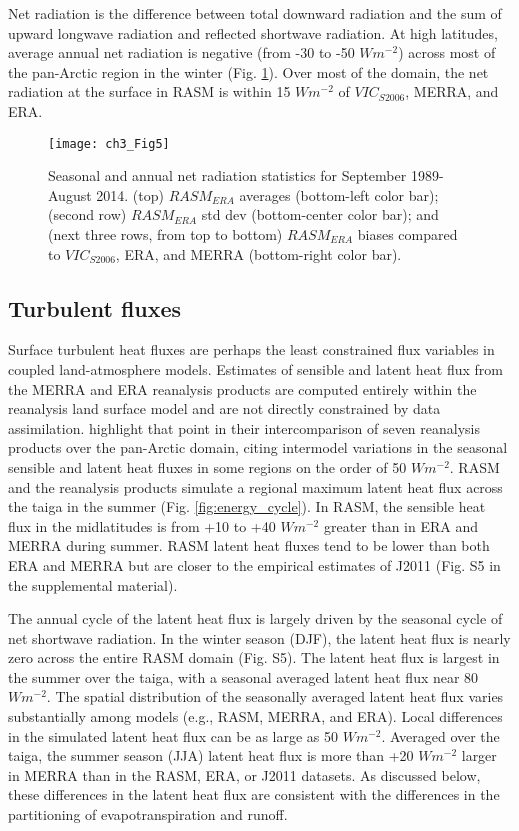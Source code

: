 Net radiation is the difference between total downward radiation and the sum of upward longwave radiation and reflected shortwave radiation.
At high latitudes, average annual net radiation is negative (from -30 to -50 $W m^{-2}$) across most of the pan-Arctic region in the winter (Fig. \ref{fig:nrad_maps}).
Over most of the domain, the net radiation at the surface in RASM is within 15 $W m^{-2}$ of $VIC_{S2006}$, MERRA, and ERA.

\begin{figure}
  \centering
  \texttt{[image: ch3\_Fig5]}
  \caption{Seasonal and annual net radiation statistics for September 1989-August 2014.
  (top) $RASM_{ERA}$ averages (bottom-left color bar); (second row) $RASM_{ERA}$ std dev (bottom-center color bar); and (next three rows, from top to bottom) $RASM_{ERA}$ biases compared to $VIC_{S2006}$, ERA, and MERRA (bottom-right color bar).}
  \label{fig:nrad_maps}
\end{figure}

\subsection{Turbulent fluxes}

Surface turbulent heat fluxes are perhaps the least constrained flux variables in coupled land-atmosphere models.
Estimates of sensible and latent heat flux from the MERRA and ERA reanalysis products are computed entirely within the reanalysis land surface model and are not directly constrained by data assimilation.
\citet{Lindsay_2014} highlight that point in their intercomparison of seven reanalysis products over the pan-Arctic domain, citing intermodel variations in the seasonal sensible and latent heat fluxes in some regions on the order of 50 $W m^{-2}$.
RASM and the reanalysis products simulate a regional maximum latent heat flux across the taiga in the summer (Fig. \ref{fig:energy_cycle}).
In RASM, the sensible heat flux in the midlatitudes is from +10 to +40 $W m^{-2}$ greater than in ERA and MERRA during summer.
RASM latent heat fluxes tend to be lower than both ERA and MERRA but are closer to the empirical estimates of J2011 (Fig. S5 in the supplemental material).

The annual cycle of the latent heat flux is largely driven by the seasonal cycle of net shortwave radiation.
In the winter season (DJF), the latent heat flux is nearly zero across the entire RASM domain (Fig. S5).
The latent heat flux is largest in the summer over the taiga, with a seasonal averaged latent heat flux near 80 $W m^{-2}$.
The spatial distribution of the seasonally averaged latent heat flux varies substantially among models (e.g., RASM, MERRA, and ERA).
Local differences in the simulated latent heat flux can be as large as 50 $W m^{-2}$.
Averaged over the taiga, the summer season (JJA) latent heat flux is more than +20 $W m^{-2}$ larger in MERRA than in the RASM, ERA, or J2011 datasets.
As discussed below, these differences in the latent heat flux are consistent with the differences in the partitioning of evapotranspiration and runoff.

